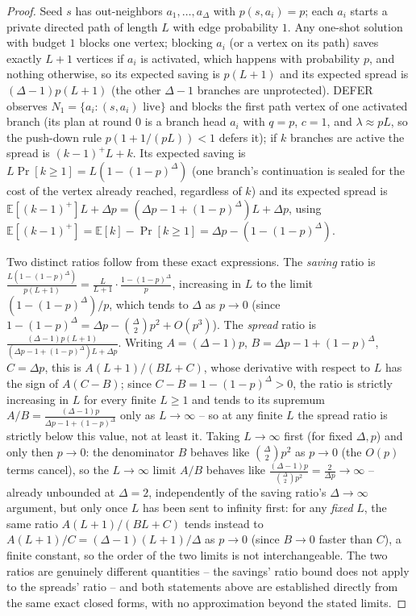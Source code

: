 \documentclass[ASNA,number]{USG}
\begin{document}
\begin{proof}
Seed $s$ has out-neighbors $a_1,\dots,a_\Delta$ with $p(s,a_i)=p$; each
$a_i$ starts a private directed path of length $L$ with edge probability
$1$. Any one-shot solution with budget $1$ blocks one vertex; blocking
$a_i$ (or a vertex on its path) saves exactly $L+1$ vertices if $a_i$ is
activated, which happens with probability $p$, and nothing otherwise, so
its expected saving is $p(L+1)$ and its expected spread is
$(\Delta-1)p(L+1)$ (the other $\Delta-1$ branches are unprotected). DEFER
observes $N_1=\{a_i:(s,a_i)\text{ live}\}$ and blocks the first path vertex
of one activated branch (its plan at round $0$ is a branch head $a_i$ with
$q=p$, $c=1$, and $\lambda\approx pL$, so the push-down rule
$p(1+1/(pL))<1$ defers it); if $k$ branches are active the spread is
$(k-1)^+L+k$. Its expected saving is $L\Pr[k\ge1]=L(1-(1-p)^\Delta)$ (one
branch's continuation is sealed for the cost of the vertex already reached,
regardless of $k$) and its expected spread is
$\mathbb E[(k-1)^+]L+\Delta p=(\Delta p-1+(1-p)^\Delta)L+\Delta p$, using
$\mathbb E[(k-1)^+]=\mathbb E[k]-\Pr[k\ge1]=\Delta p-(1-(1-p)^\Delta)$.

Two distinct ratios follow from these exact expressions. The \emph{saving}
ratio is $\frac{L(1-(1-p)^\Delta)}{p(L+1)}=\frac{L}{L+1}\cdot
\frac{1-(1-p)^\Delta}{p}$, increasing in $L$ to the limit
$(1-(1-p)^\Delta)/p$, which tends to $\Delta$ as $p\to0$ (since
$1-(1-p)^\Delta=\Delta p-\binom\Delta2p^2+O(p^3)$). The \emph{spread} ratio
is $\frac{(\Delta-1)p(L+1)}{(\Delta p-1+(1-p)^\Delta)L+\Delta p}$. Writing
$A=(\Delta-1)p$, $B=\Delta p-1+(1-p)^\Delta$, $C=\Delta p$, this is
$A(L+1)/(BL+C)$, whose derivative with respect to $L$ has the sign of
$A(C-B)$; since $C-B=1-(1-p)^\Delta>0$, the ratio is strictly increasing in
$L$ for every finite $L\ge1$ and tends to its supremum $A/B=\frac{(\Delta-1)p}
{\Delta p-1+(1-p)^\Delta}$ only as $L\to\infty$ -- so at any finite $L$ the
spread ratio is strictly below this value, not at least it. Taking
$L\to\infty$ first (for fixed $\Delta,p$) and only then $p\to0$: the
denominator $B$ behaves like $\binom\Delta2p^2$ as $p\to0$ (the $O(p)$
terms cancel), so the $L\to\infty$ limit $A/B$ behaves like
$\frac{(\Delta-1)p}{\binom\Delta2p^2}=\frac{2}{\Delta p}\to\infty$ --
already unbounded at $\Delta=2$, independently of the saving ratio's
$\Delta\to\infty$ argument, but only once $L$ has been sent to infinity
first: for any \emph{fixed} $L$, the same ratio $A(L+1)/(BL+C)$ tends
instead to $A(L+1)/C=(\Delta-1)(L+1)/\Delta$ as $p\to0$ (since $B\to0$
faster than $C$), a finite constant, so the order of the two limits is not
interchangeable. The two ratios are genuinely different quantities -- the
savings' ratio bound does not apply to the spreads' ratio -- and both
statements above are established directly from the same exact closed
forms, with no approximation beyond the stated limits.
\end{proof}
\end{document}
